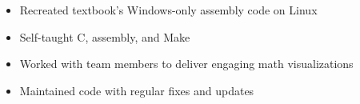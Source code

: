 \documentclass[10pt]{article}
\begin{document}

	\begin{itemize}[noitemsep,topsep=0.25em]
		\item Recreated textbook's Windows-only assembly code on Linux
		\item Self-taught C, assembly, and Make
	\end{itemize}


	\begin{itemize}[noitemsep,topsep=0.25em]
		\item Worked with team members to deliver engaging math visualizations
	\end{itemize}


	\begin{itemize}[noitemsep,topsep=0.25em]
		\item Maintained code with regular fixes and updates
	\end{itemize}
\end{document}
